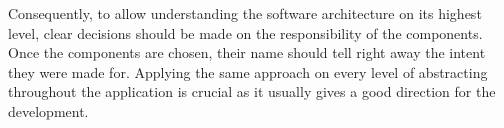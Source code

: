 \documentclass[conference]{IEEEtran}
\begin{document}
Consequently, to allow understanding the software architecture on its highest level, clear decisions should be made on the responsibility of the components. Once the components are chosen, their name should tell right away the intent they were made for. Applying the same approach on every level of abstracting throughout the application is crucial as it usually gives a good direction for the development.
%
%



%
%
\end{document}
